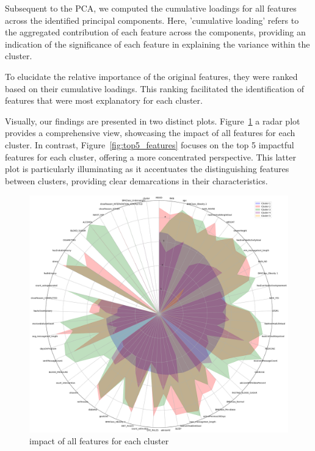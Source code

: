 \documentclass[12pt]{article}
\begin{document}
Subsequent to the PCA, we computed the cumulative loadings for all features across the identified principal components. Here, 'cumulative loading' refers to the aggregated contribution of each feature across the components, providing an indication of the significance of each feature in explaining the variance within the cluster.

To elucidate the relative importance of the original features, they were ranked based on their cumulative loadings. This ranking facilitated the identification of features that were most explanatory for each cluster.

Visually, our findings are presented in two distinct plots. 
Figure~\ref{fig:all_features} a radar plot provides a comprehensive view, showcasing the impact of all features for each cluster. 
In contrast, Figure~\ref{fig:top5_features} focuses on the top 5 impactful features for each cluster, offering a more concentrated perspective. This latter plot is particularly illuminating as it accentuates the distinguishing features between clusters, providing clear demarcations in their characteristics.

\begin{figure}[h]
  \centering
  \includegraphics[width=0.7\linewidth]{images/all_feature}
  \caption{impact of all features for each cluster}
  \label{fig:all_features}
  \end{figure}
\end{document}
